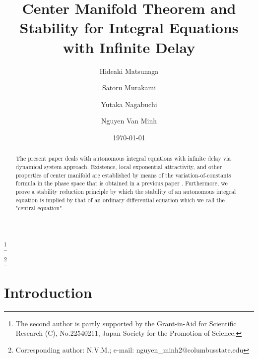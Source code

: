 \documentclass[12pt]{amsart}
\begin{document}
\title[Center Manifold Theorem and Stability]{Center Manifold Theorem and Stability for Integral Equations 
with Infinite Delay} 

\author{
Hideaki Matsunaga}

\address{Department of Mathematical Sciences, Osaka Prefecture University,
Sakai 599-8531, Japan}

\bigskip 

\author{Satoru Murakami}
\thanks{
The second author is partly supported by the Grant-in-Aid 
for Scientific Research (C), No.22540211, 
Japan Society for the Promotion of Science.
}
\address{Department of Applied Mathematics, Okayama University of Science,
Okayama 700-0005, Japan}

\bigskip

\author{Yutaka Nagabuchi}
\address{Department of Applied Science, Okayama University of Science,
Okayama 700-0005, Japan}
\author{Nguyen Van Minh}

\address{ Department of Mathematics and Philosophy, Columbus State University,
4225 University Avenue, Columbus GA 31907. USA}

\begin{abstract}
The present paper deals with autonomous integral equations with infinite delay via dynamical system approach. Existence, local exponential attractivity, and other properties of center manifold are established by means of the 
variation-of-constants formula in the phase space that is obtained in a previous paper \cite{mur}.   
Furthermore, we prove a stability reduction principle by which the stability of an autonomous 
integral equation is implied
by that of an ordinary differential equation which we call the 
"central equation".
\end{abstract}
\thanks{Corresponding author: N.V.M.; e-mail: nguyen\_minh2@columbusstate.edu
}


\date{\today}
\maketitle

\section{Introduction}  
\end{document}
